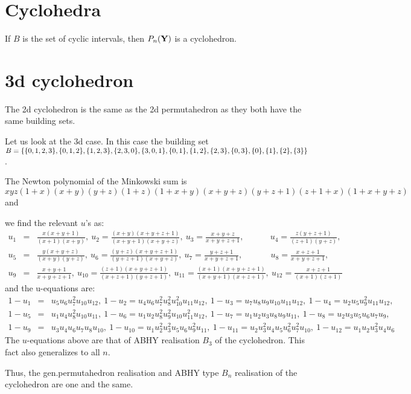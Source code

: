 \documentclass[hidelinks,12pt]{article}
\newcommand{\bea}[1]{\begin{eqnarray}\label{#1} }
\newcommand{\eea}{\end{eqnarray}}
\def\bea{\begin{eqnarray}}
\def\eea{\end{eqnarray}}
\begin{document}
\section*{Cyclohedra}
If $B$  is the set of cyclic intervals, then $P_n({\bf Y})$ is a cyclohedron.
\section*{3d cyclohedron}
The 2d cyclohedron is the same as the 2d permutahedron as they both have the same building sets.

 Let us look at the 3d case. In this case the building set $B=\{ \{ 0,1,2,3\},\{ 0,1,2\},\{1,2,3\},\{2,3,0\},\{3,0,1\}, \\  \{0,1\},\{1,2\},\{2,3\},\{0,3\},\{0\},\{1\},\{2\},\{3\}\}$.
 
 The Newton polynomial of the Minkowski sum is $x y z(1+x)(x+y)(y+z)(1+z)(1+x+y)(x+y+z)(y+z+1)(z+1+x)(1+x+y+z)$ and 
 
 we  find the relevant $u$'s as:
\bea
u_1 &=&\frac{x (x+y+1)}{(x+1) (x+y)},~u_2 = \frac{(x+y) (x+y+z+1)}{(x+y+1) (x+y+z)},~u_3 = \frac{x+y+z}{x+y+z+1},~~~~~~~~~~~~~~u_4= \frac{z
   (y+z+1)}{(z+1) (y+z)}, \nonumber \\
   u_5 &=& \frac{y (x+y+z)}{(x+y) (y+z)},~u_6 = \frac{(y+z) (x+y+z+1)}{(y+z+1) (x+y+z)},~u_7 =
   \frac{y+z+1}{x+y+z+1},~~~~~~~~~~~~~~~u_8= \frac{x+z+1}{x+y+z+1}, \nonumber \\
   u_9 &=& \frac{x+y+1}{x+y+z+1},~u_{10} = \frac{(z+1) (x+y+z+1)}{(x+z+1) (y+z+1)},~u_{11}=
   \frac{(x+1) (x+y+z+1)}{(x+y+1) (x+z+1)},~u_{12} =\frac{x+z+1}{(x+1) (z+1)} \nonumber
\eea
and the u-equations  are:
\bea
1-u_1&=&u_5 u_6 u_7^2 u_{10} u_{12},~1-u_2=u_4 u_6 u_7^2 u_8^2 u_{10}^2 u_{11} u_{12},~1-u_3=u_7 u_8 u_9 u_{10} u_{11} u_{12},~1-u_4=u_2 u_5
   u_9^2 u_{11} u_{12}, \nonumber \\
   1-u_5 &=& u_1 u_4 u_8^2 u_{10} u_{11},~1-u_6=u_1 u_2 u_8^2 u_9^2 u_{10} u_{11}^2 u_{12},~1-u_7=u_1 u_2 u_3 u_8 u_9
   u_{11},~1-u_8=u_2 u_3 u_5 u_6 u_7 u_9, \nonumber \\
   1-u_9&=&u_3 u_4 u_6 u_7 u_8 u_{10},~1-u_{10}=u_1 u_2^2 u_3^2 u_5 u_6 u_9^2 u_{11},~1-u_{11}=u_2 u_3^2 u_4
   u_5 u_6^2 u_7^2 u_{10},~1-u_{12}=u_1 u_2 u_3^2 u_4 u_6 \nonumber
\eea
The $u$-equations above are that of ABHY realisation $B_3$ of the cyclohedron. This fact also generalizes to all $n$.

Thus, the gen.permutahedron realisation and ABHY type $B_n$ realisation of the cyclohedron are one and the same.
\end{document}
